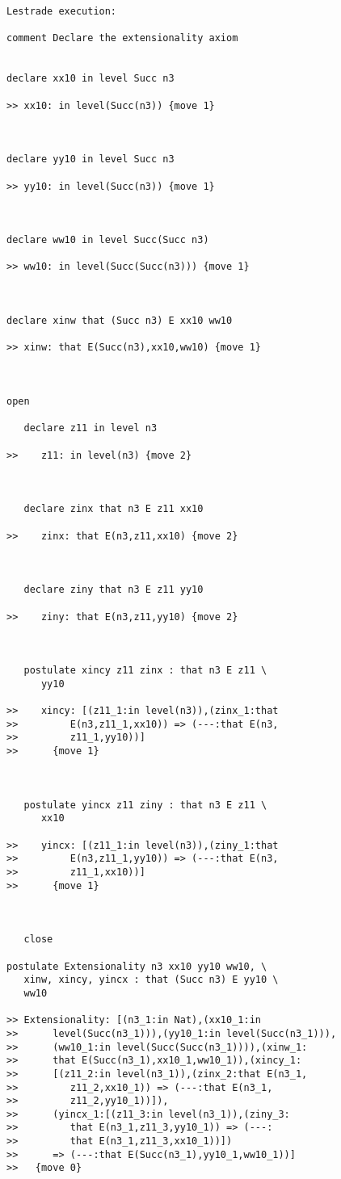 \documentclass[12pt]{article}
\begin{document}
\begin{verbatim}Lestrade execution:

comment Declare the extensionality axiom


declare xx10 in level Succ n3

>> xx10: in level(Succ(n3)) {move 1}



declare yy10 in level Succ n3

>> yy10: in level(Succ(n3)) {move 1}



declare ww10 in level Succ(Succ n3)

>> ww10: in level(Succ(Succ(n3))) {move 1}



declare xinw that (Succ n3) E xx10 ww10

>> xinw: that E(Succ(n3),xx10,ww10) {move 1}



open

   declare z11 in level n3

>>    z11: in level(n3) {move 2}



   declare zinx that n3 E z11 xx10

>>    zinx: that E(n3,z11,xx10) {move 2}



   declare ziny that n3 E z11 yy10

>>    ziny: that E(n3,z11,yy10) {move 2}



   postulate xincy z11 zinx : that n3 E z11 \
      yy10

>>    xincy: [(z11_1:in level(n3)),(zinx_1:that
>>         E(n3,z11_1,xx10)) => (---:that E(n3,
>>         z11_1,yy10))]
>>      {move 1}



   postulate yincx z11 ziny : that n3 E z11 \
      xx10

>>    yincx: [(z11_1:in level(n3)),(ziny_1:that
>>         E(n3,z11_1,yy10)) => (---:that E(n3,
>>         z11_1,xx10))]
>>      {move 1}



   close

postulate Extensionality n3 xx10 yy10 ww10, \
   xinw, xincy, yincx : that (Succ n3) E yy10 \
   ww10

>> Extensionality: [(n3_1:in Nat),(xx10_1:in
>>      level(Succ(n3_1))),(yy10_1:in level(Succ(n3_1))),
>>      (ww10_1:in level(Succ(Succ(n3_1)))),(xinw_1:
>>      that E(Succ(n3_1),xx10_1,ww10_1)),(xincy_1:
>>      [(z11_2:in level(n3_1)),(zinx_2:that E(n3_1,
>>         z11_2,xx10_1)) => (---:that E(n3_1,
>>         z11_2,yy10_1))]),
>>      (yincx_1:[(z11_3:in level(n3_1)),(ziny_3:
>>         that E(n3_1,z11_3,yy10_1)) => (---:
>>         that E(n3_1,z11_3,xx10_1))])
>>      => (---:that E(Succ(n3_1),yy10_1,ww10_1))]
>>   {move 0}


\end{verbatim}
\end{document}
